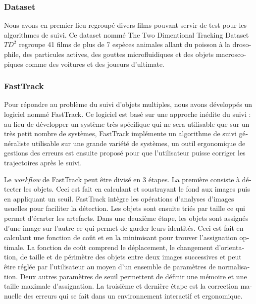 \begin{otherlanguage}{french}
\subsubsection*{Dataset}
Nous avons en premier lieu regroupé divers films pouvant servir de test pour les algorithmes de suivi. Ce dataset nommé The Two Dimentional Tracking Dataset $TD^2$ regroupe 41 films de plus de 7 espèces animales allant du poisson à la drosophile, des particules actives, des gouttes microfluidiques et des objets macroscopiques comme des voitures et des joueurs d'ultimate.

\subsubsection*{FastTrack}
Pour répondre au problème du suivi d'objets multiples, nous avons développés un logiciel nommé FastTrack. Ce logiciel est basé sur une approche inédite du suivi : au lieu de développer un système très spécifique qui ne sera utilisable que sur un très petit nombre de systèmes, FastTrack implémente un algorithme de suivi généraliste utilisable sur une grande variété de systèmes, un outil ergonomique de gestions des erreurs est ensuite proposé pour que l'utilisateur puisse corriger les trajectoires après le suivi.

Le \textit{workflow} de FastTrack peut être divisé en 3 étapes. La première consiste à détecter les objets. Ceci est fait en calculant et soustrayant le fond aux images puis en appliquant un seuil. FastTrack intègre les opérations d'analyses d'images usuelles pour faciliter la détection. Les objets sont ensuite triés par taille ce qui permet d'écarter les artefacts. Dans une deuxième étape, les objets sont assignés d'une image sur l'autre ce qui permet de garder leurs identités. Ceci est fait en calculant une fonction de coût et en la minimisant pour trouver l'assignation optimale. La fonction de coût comprend le déplacement, le changement d'orientation, de taille et de périmètre des objets entre deux images successives et peut être réglée par l'utilisateur au moyen d'un ensemble de paramètres de normalisation. Deux autres paramètres de seuil permettent de définir une mémoire et une taille maximale d'assignation. La troisième et dernière étape est la correction manuelle des erreurs qui se fait dans un environnement interactif et ergonomique.


\end{otherlanguage}
